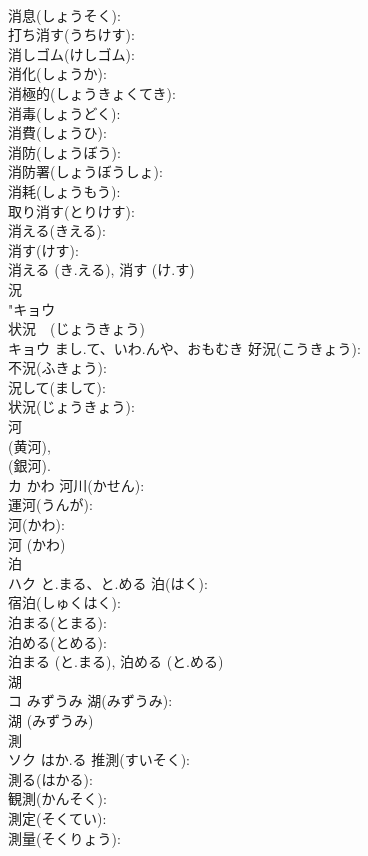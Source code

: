 \documentclass[8pt]{extreport}
\begin{document}
\begin{CJK}{UTF8}{min}
\\	消息(しょうそく): 
\\	打ち消す(うちけす): 
\\	消しゴム(けしゴム): 
\\	消化(しょうか): 
\\	消極的(しょうきょくてき): 
\\	消毒(しょうどく): 
\\	消費(しょうひ): 
\\	消防(しょうぼう): 
\\	消防署(しょうぼうしょ): 
\\	消耗(しょうもう): 
\\	取り消す(とりけす): 
\\	消える(きえる): 
\\	消す(けす): 
\\	消える (き.える), 消す (け.す)
\\	況			
\\	"キョウ 
\\	状況　(じょうきょう)　
\\	キョウ	まし.て、いわ.んや、おもむき	好況(こうきょう): 
\\	不況(ふきょう): 
\\	況して(まして): 
\\	状況(じょうきょう): 
\\	河			
\\	(黄河), 
\\	(銀河). 
\\	カ	かわ	河川(かせん): 
\\	運河(うんが): 
\\	河(かわ): 
\\	河 (かわ)
\\	泊			
\\	ハク	と.まる、と.める	泊(はく): 
\\	宿泊(しゅくはく): 
\\	泊まる(とまる): 
\\	泊める(とめる): 
\\	泊まる (と.まる), 泊める (と.める)
\\	湖			
\\	コ	みずうみ	湖(みずうみ): 
\\	湖 (みずうみ)
\\	測			
\\	ソク	はか.る	推測(すいそく): 
\\	測る(はかる): 
\\	観測(かんそく): 
\\	測定(そくてい): 
\\	測量(そくりょう): 

\end{CJK}
\end{document}
